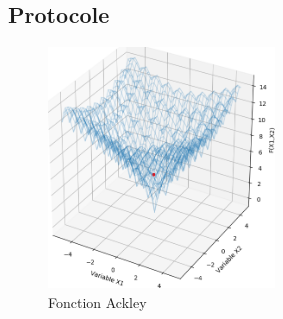 \documentclass[12pt]{report}
\begin{document}
      \subsection{Protocole}
        \begin{figure}
          \centering
          \includegraphics[width=6cm]{img/ackley.png}
          \caption{Fonction Ackley \cite{wiki5}}
          \label{ackley}
        \end{figure}
\end{document}
